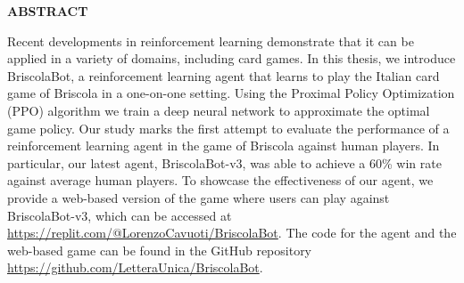 \begin{center}
    \bf ABSTRACT
\end{center}
Recent developments in reinforcement learning demonstrate that it can be applied in a variety of domains, including card games. In this thesis, we introduce BriscolaBot, a reinforcement learning agent that learns to play the Italian card game of Briscola in a one-on-one setting. Using the Proximal Policy Optimization (PPO) algorithm we train a deep neural network to approximate the optimal game policy. Our study marks the first attempt to evaluate the performance of a reinforcement learning agent in the game of Briscola against human players. In particular, our latest agent, BriscolaBot-v3, was able to achieve a 60\% win rate against average human players. To showcase the effectiveness of our agent, we provide a web-based version of the game where users can play against BriscolaBot-v3, which can be accessed at \url{https://replit.com/@LorenzoCavuoti/BriscolaBot}. The code for the agent and the web-based game can be found in the GitHub repository \url{https://github.com/LetteraUnica/BriscolaBot}.